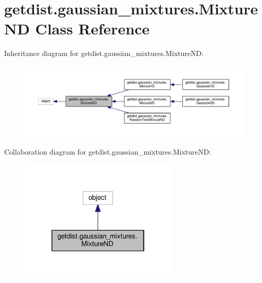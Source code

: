 \hypertarget{classgetdist_1_1gaussian__mixtures_1_1MixtureND}{}\section{getdist.\+gaussian\+\_\+mixtures.\+Mixture\+ND Class Reference}
\label{classgetdist_1_1gaussian__mixtures_1_1MixtureND}


Inheritance diagram for getdist.\+gaussian\+\_\+mixtures.\+Mixture\+ND\+:
\nopagebreak
\begin{figure}[H]
\begin{center}
\leavevmode
\includegraphics[width=350pt]{classgetdist_1_1gaussian__mixtures_1_1MixtureND__inherit__graph}
\end{center}
\end{figure}


Collaboration diagram for getdist.\+gaussian\+\_\+mixtures.\+Mixture\+ND\+:
\nopagebreak
\begin{figure}[H]
\begin{center}
\leavevmode
\includegraphics[width=214pt]{classgetdist_1_1gaussian__mixtures_1_1MixtureND__coll__graph}
\end{center}
\end{figure}
